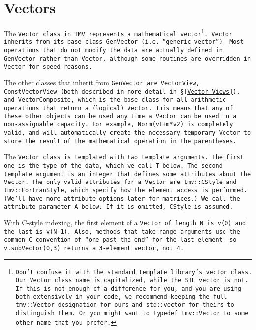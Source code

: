 
\section{Vectors}
\label{Vector}

The \tt{Vector} class in TMV represents a mathematical vector\footnote{Don't confuse it with
the standard template library's \tt{vector} class.
Our \tt{Vector} class name is capitalized, while the STL \tt{vector} is not.
If this is not enough of a difference for you, and you are using both extensively in your code,
we recommend keeping the full \tt{tmv::Vector} designation for ours and \tt{std::vector}
for theirs to distinguish them.  Or you might want to \tt{typedef tmv::Vector} to some other name that you prefer.}.
\tt{Vector} inherits from its base class \tt{GenVector} (i.e. ``generic vector'').
Most operations that do not 
modify the data are actually defined in \tt{GenVector} rather than \tt{Vector}, although
some routines are overridden in \tt{Vector} for speed reasons.  

The other classes that inherit from \tt{GenVector} are \tt{VectorView}, 
\tt{ConstVectorView} (both described in more detail in \S\ref{Vector_Views}), and
\tt{VectorComposite}, which is the base class for all arithmetic operations that
return a (logical) \tt{Vector}.  This means that any of these other objects can be used
any time a \tt{Vector} can be used in a non-assignable capacity.  For example,
\tt{Norm(v1+m*v2)} is completely valid, and will automatically create the necessary
temporary \tt{Vector} to store the result of the mathematical operation in the parentheses.

The \tt{Vector} class is templated with two template arguments.  The first one is the type of
the data, which we call \tt{T} below.
The second template argument is an integer that defines some attributes about the \tt{Vector}.
The only valid attributes for a \tt{Vector}
are \tt{tmv::CStyle} and \tt{tmv::FortranStyle}, which specify how the element
access is performed.  (We'll have more attribute options later for
matrices.)  We call the attribute parameter \tt{A} below.  If it is omitted, \tt{CStyle} is assumed.  

With C-style indexing, the first element of a \tt{Vector} of length \tt{N} is 
\tt{v(0)} and the last is \tt{v(N-1)}.  Also, methods that take range arguments
use the common C convention of ``one-past-the-end'' for the last element;
so \tt{v.subVector(0,3)} returns a 3-element vector, not 4.


